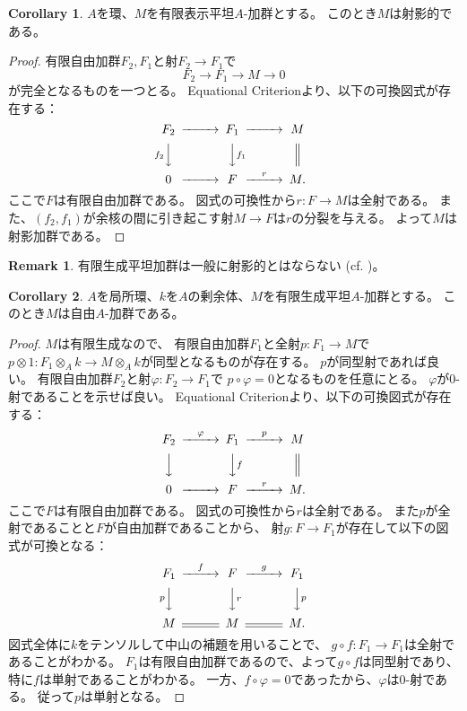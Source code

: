 \documentclass[uplatex]{jsarticle}
\theoremstyle{definition}
\newtheorem{cor}[cor]{Corollary}
\newtheorem{rem}[rem]{Remark}
\begin{document}
\begin{cor}
  \(A\)を環、\(M\)を有限表示平坦\(A\)-加群とする。
  このとき\(M\)は射影的である。
\end{cor}

\begin{proof}
  有限自由加群\(F_2,F_1\)と射\(F_2\to F_1\)で
  \[
  F_2\to F_1\to M\to 0
  \]
  が完全となるものを一つとる。
  Equational Criterionより、以下の可換図式が存在する：
  \[
  \begin{CD}
    F_2 @>>> F_1 @>>> M \\
    @Vf_2VV @VVf_1V @| \\
    0 @>>> F @>r>> M.
  \end{CD}
  \]
  ここで\(F\)は有限自由加群である。
  図式の可換性から\(r:F\to M\)は全射である。
  また、\((f_2,f_1)\)が余核の間に引き起こす射\(M\to F\)は\(r\)の分裂を与える。
  よって\(M\)は射影加群である。
\end{proof}


\begin{rem}
  有限生成平坦加群は一般に射影的とはならない
  (cf. \cite[\href{https://stacks.math.columbia.edu/tag/00NY}{Tag 00NY}]{stacks-project})。
\end{rem}



\begin{cor}\label{cor: fg flat over local is free}
  \(A\)を局所環、\(k\)を\(A\)の剰余体、\(M\)を有限生成平坦\(A\)-加群とする。
  このとき\(M\)は自由\(A\)-加群である。
\end{cor}


\begin{proof}
  \(M\)は有限生成なので、
  有限自由加群\(F_1\)と全射\(p:F_1\to M\)で
  \(p\otimes 1:F_1\otimes_Ak \to M\otimes_Ak\)が同型となるものが存在する。
  \(p\)が同型射であれば良い。
  有限自由加群\(F_2\)と射\(\varphi:F_2\to F_1\)で
  \(p\circ \varphi = 0\)となるものを任意にとる。
  \(\varphi\)が\(0\)-射であることを示せば良い。
  Equational Criterionより、以下の可換図式が存在する：
  \[
  \begin{CD}
    F_2 @>\varphi>> F_1 @>p>> M \\
    @VVV @VVfV @| \\
    0 @>>> F @>r>> M.
  \end{CD}
  \]
  ここで\(F\)は有限自由加群である。
  図式の可換性から\(r\)は全射である。
  また\(p\)が全射であることと\(F\)が自由加群であることから、
  射\(g:F\to F_1\)が存在して以下の図式が可換となる：
  \[
  \begin{CD}
    F_1 @>f>> F @>g>> F_1 \\
    @VpVV @VVrV @VVpV \\
    M @= M @= M.
  \end{CD}
  \]
  図式全体に\(k\)をテンソルして中山の補題を用いることで、
  \(g\circ f:F_1\to F_1\)は全射であることがわかる。
  \(F_1\)は有限自由加群であるので、よって\(g\circ f\)は同型射であり、
  特に\(f\)は単射であることがわかる。
  一方、\(f\circ \varphi = 0\)であったから、\(\varphi\)は\(0\)-射である。
  従って\(p\)は単射となる。
\end{proof}
\end{document}

